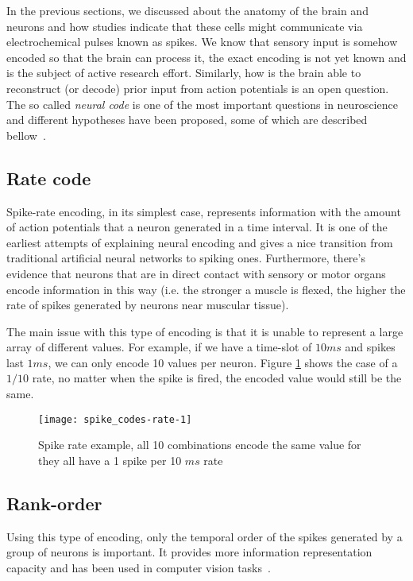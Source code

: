 In the previous sections, we discussed about the anatomy of the brain and neurons and how studies indicate that these cells might communicate via electrochemical pulses known as spikes. We know that sensory input is somehow encoded so that the brain can process it, the exact encoding is not yet known and is the subject of active research effort. Similarly, how is the brain able to reconstruct (or decode) prior input from action potentials is an open question. The so called \emph{neural code} is one of the most important questions in neuroscience and different hypotheses have been proposed, some of which are described bellow~\cite{dayan2001theoretical,gollisch2009throwing}.

\subsection{Rate code}
Spike-rate encoding, in its simplest case, represents information with the amount of action potentials that a neuron generated in a time interval. It is one of the earliest attempts of explaining neural encoding and gives a nice transition from traditional artificial neural networks to spiking ones. Furthermore, there's evidence that neurons that are in direct contact with sensory or motor organs encode information in this way (i.e. the stronger a muscle is flexed, the higher the rate of spikes generated by neurons near muscular tissue).

The main issue with this type of encoding is that it is unable to represent  a large array of different values. For example, if we have a time-slot of $10 ms$ and spikes last $1 ms$, we can only encode 10 values per neuron. Figure \ref{fig:neuro:spike-rate-encoding-cap} shows the case of a $1/10$ rate, no matter when the spike is fired, the encoded value would still be the same.

\begin{figure}[hbt]
  \begin{center}
    \texttt{[image: spike\_codes-rate-1]}
    \caption{Spike rate example, all 10 combinations encode the same value for they all have a 1 spike per 10 $ms$ rate}
    \label{fig:neuro:spike-rate-encoding-cap}
  \end{center}
\end{figure}

\subsection{Rank-order}
Using this type of encoding, only the temporal order of the spikes generated by a group of neurons is important. It provides more information representation capacity and has been used in computer vision tasks~\cite{rank-order-sparse-memory,basab-model,thorpe-rate-coding-theory}.


